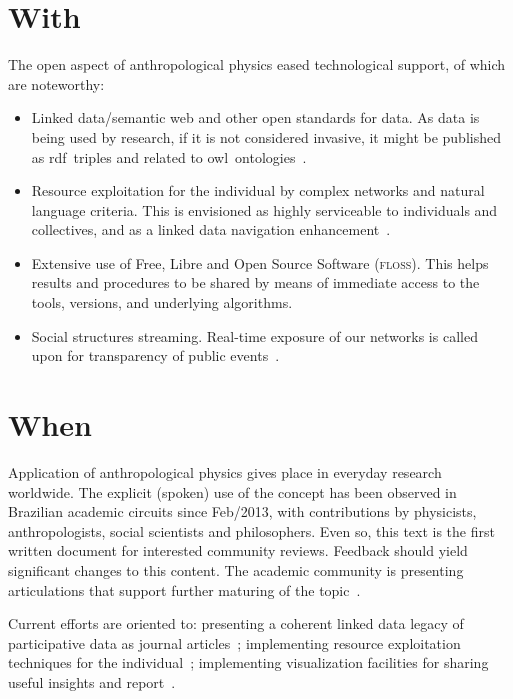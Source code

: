 \documentclass[a4paper, 11pt]{article} %
\newcommand{\floss}{\textsc{floss}}
\newcommand{\aai}{\textsc{Aa}}
\newcommand{\owl}{{\sc owl}}
\newcommand{\rdf}{{\sc rdf}}
\begin{document}
\section*{With}
The open aspect of anthropological physics eased technological support, of which are noteworthy:
\begin{itemize}
    \item Linked data/semantic web and other open standards for data. As data is being used by research, if it is not considered invasive, it might be published as \rdf\ triples and related to \owl\ ontologies~\cite{LOD,linkedDataBook,pnud5}.
    \item Resource exploitation for the individual by complex networks and natural language criteria. This is envisioned as highly serviceable to individuals and collectives, and as a linked data navigation enhancement~\cite{pnud3,pnud4}.
    \item Extensive use of Free, Libre and Open Source Software (\floss). This helps results and procedures to be shared by means of immediate access to the tools, versions, and underlying algorithms.
    \item Social structures streaming. Real-time exposure of our networks is called upon for transparency of public events~\cite{ocupagov}.
\end{itemize}

\section*{When}
Application of anthropological physics gives place in everyday research worldwide.
The explicit (spoken) use of the concept has been observed in Brazilian academic circuits since
Feb/2013, with contributions by physicists, anthropologists, social scientists and philosophers.
Even so, this text is the first written document for interested community reviews.
Feedback should yield significant changes to this content. The academic
community is presenting articulations that support further maturing of the topic~\cite{reunioesNexus}.

Current efforts are oriented to: presenting 
a coherent linked data legacy of participative data 
as journal articles~\cite{pnud5}; implementing
resource exploitation techniques for the individual~\cite{pnud4};
 implementing visualization facilities for sharing useful insights
and report~\cite{ocupagov,appGMANE}.

\end{document}
